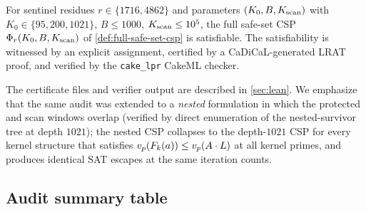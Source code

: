 \begin{theorem}
\label{thm:interval-cover-insufficiency}
For sentinel residues $r \in \{1716, 4862\}$ and parameters
$(K_0, B, K_{\rm scan})$ with $K_0 \in \{95, 200, 1021\}$,
$B \le 1000$, $K_{\rm scan} \le 10^5$, the full safe-set CSP
$\Phi_r(K_0, B, K_{\rm scan})$ of
\cref{def:full-safe-set-csp} is satisfiable. The satisfiability is
witnessed by an explicit assignment, certified by a CaDiCaL-generated
LRAT proof, and verified by the \texttt{cake\_lpr} CakeML checker.
\end{theorem}

The certificate files and verifier output are described in
\cref{sec:lean}. We emphasize that the same audit was extended to a
\emph{nested} formulation in which the protected and scan windows
overlap (verified by direct enumeration of the nested-survivor tree at depth $1021$); the nested CSP
collapses to the depth-$1021$ CSP for every kernel structure that
satisfies $v_p(F_k(a)) \le v_p(A \cdot L)$ at all kernel
primes, and produces identical SAT escapes at the same iteration
counts.

\subsection{Audit summary table}
\label{sec:audit-summary}

